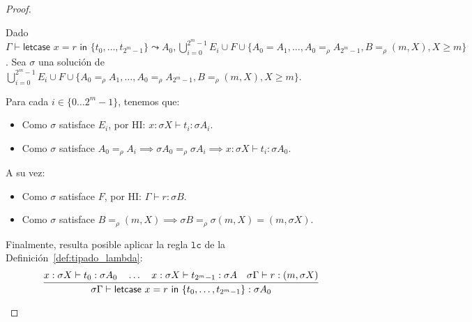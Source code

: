 \begin{proof}
\begin{itemize}
Dado $\Gamma \vdash \textsf{letcase } x = r \textsf{ in  }\{t_0,\dots,t_{2^m-1}\}  \leadsto A_0, \bigcup_{i=0}^{2^m-1} E_i \cup F \cup \{A_0=A_1, \dots, A_0=_\rho A_{2^m-1}, B =_\rho (m, X), X\geq m\}$. Sea $\sigma$ una solución de $\bigcup_{i=0}^{2^m-1} E_i \cup F \cup \{A_0=_\rho A_1, \dots, A_0=_\rho A_{2^m-1}, B =_\rho (m, X), X\geq m\}$.

Para cada $i \in \{0\dots 2^m-1\}$, tenemos que:
\begin{itemize}
    \item Como $\sigma$ satisface $E_i$, por HI: $x: \sigma X \vdash t_i: \sigma A_i$.
    \item Como $\sigma$ satisface $A_0=_\rho A_i \implies \sigma A_0 =_\rho \sigma A_i \implies x: \sigma X \vdash t_i: \sigma A_0$.
\end{itemize}
A su vez:
\begin{itemize}
    \item Como $\sigma$ satisface $F$, por HI: $\Gamma \vdash r:\sigma B$.
    \item Como $\sigma$ satisface $B =_\rho (m, X)\implies\sigma B =_\rho \sigma (m, X) = (m, \sigma X)$.
\end{itemize}

Finalmente, resulta posible aplicar la regla $\mathtt{lc}$ de la Definición~\ref{def:tipado_lambda}:
\begin{equation*}
     \infer
     {\sigma \Gamma \vdash \textsf{letcase } x = r \textsf{ in  }\{t_0,\dots,t_{2^m-1}\} : \sigma A_0}
     {x:\sigma X\vdash t_0 : \sigma A_0  \quad \dots\quad x:\sigma X\vdash t_{2^m-1}:\sigma A\quad \sigma \Gamma \vdash r:(m, \sigma X)}
\end{equation*}
\end{itemize}
\end{proof}







